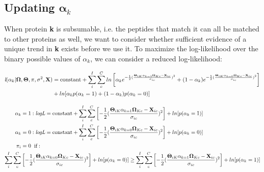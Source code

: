 \subsection*{Updating $\mathbf{\alpha}_{k}$}

When protein \textbf{k} is subsumable, i.e. the peptides that match it can all be matched to other proteins as well, we want to consider whether sufficient evidence of a unique trend in \textbf{k} exists before we use it.  To maximize the log-likelihood over the binary possible values of $\alpha_{k}$, we can consider a reduced log-likelihood:

\begin{align}
\textit{l}(\alpha_{k} | \mathbf{\Omega}, \mathbf{\Theta}, \pi, \sigma^{2}, \textbf{X}) &= \text{constant} + \sum_{i}^{I}\sum_{c}^{C}ln\left[\alpha_{k}e^{-\frac{1}{2}(\frac{\mathbf{\Theta}_{iK}\alpha_{k  = 1}\mathbf{\Omega}_{Kc} - \textbf{X}_{ic}}{\sigma_{ic}})^2} + (1-\alpha_{k})e^{-\frac{1}{2}(\frac{\mathbf{\Theta}_{iK}\alpha_{k  = 0}\mathbf{\Omega}_{Kc} - \textbf{X}_{ic}}{\sigma_{ic}})^2}\right]\notag\\
&+ ln[\alpha_{k}p(\alpha_{k} = 1) + (1-\alpha_{k})p(\alpha_{k} = 0)]\notag
\end{align}

\begin{align}
\alpha_{k} &= 1: \textit{logL} = \text{constant} + \sum_{i}^{I}\sum_{c}^{C}\left[{-\frac{1}{2}(\frac{\mathbf{\Theta}_{iK}\alpha_{k  = 1}\mathbf{\Omega}_{Kc} - \textbf{X}_{ic}}{\sigma_{ic}})^2}\right] + ln[p(\alpha_{k} = 1)]\notag\\
\alpha_{k} &= 0: \textit{logL} = \text{constant} + \sum_{i}^{I}\sum_{c}^{C}\left[{-\frac{1}{2}(\frac{\mathbf{\Theta}_{iK}\alpha_{k  = 0}\mathbf{\Omega}_{Kc} - \textbf{X}_{ic}}{\sigma_{ic}})^2}\right] + ln[p(\alpha_{k} = 0)]\notag\\
\pi_{i} &= 0 \hspace{2mm}\text{if}:\notag\\ \sum_{i}^{I}\sum_{c}^{C}&\left[{-\frac{1}{2}(\frac{\mathbf{\Theta}_{iK}\alpha_{k  = 0}\mathbf{\Omega}_{Kc} - \textbf{X}_{ic}}{\sigma_{ic}})^2}\right] + ln[p(\alpha_{k} = 0)] \ge \sum_{i}^{I}\sum_{c}^{C}\left[{-\frac{1}{2}(\frac{\mathbf{\Theta}_{iK}\alpha_{k  = 1}\mathbf{\Omega}_{Kc} - \textbf{X}_{ic}}{\sigma_{ic}})^2}\right] + ln[p(\alpha_{k} = 1)]
\end{align}


